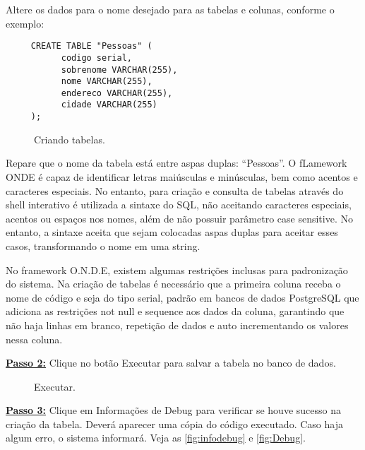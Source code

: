 \documentclass[9pt]{report}
\begin{document}
{   Altere os dados para o nome desejado para as tabelas e colunas,
   conforme o exemplo:
   
   \begin{lstlisting}
     CREATE TABLE "Pessoas" (
           codigo serial,
           sobrenome VARCHAR(255),
           nome VARCHAR(255),
           endereco VARCHAR(255),
           cidade VARCHAR(255) 
     );
   \end{lstlisting}


   \begin{figure}[H]
     \caption{Criando tabelas.}
     \label{fig:criandoTabelas}
   \end{figure}

    Repare que o nome da tabela está entre aspas duplas: “Pessoas”.
    O fLamework ONDE é capaz de identificar letras maiúsculas
    e minúsculas, bem como acentos e caracteres especiais. No
    entanto,
    para criação e consulta de tabelas através do shell interativo é
    utilizada a sintaxe do SQL, não aceitando caracteres especiais,
    acentos ou espaços nos nomes, além de não possuir parâmetro case
    sensitive. No entanto, a sintaxe aceita que sejam colocadas aspas
    duplas para aceitar esses casos, transformando o nome em uma
    string.

    No framework O.N.D.E, existem algumas restrições inclusas para
    padronização do sistema. Na criação de tabelas é necessário que
    a primeira coluna receba o nome de código e seja do tipo serial,
    padrão em bancos de dados PostgreSQL que adiciona as restrições
    not null e sequence aos dados da coluna, garantindo que não haja
    linhas em branco, repetição de dados e auto incrementando os
    valores nessa coluna.

    \underline{\textbf{Passo 2:}}  Clique no botão Executar para
    salvar a tabela no banco de dados.
   
   \begin{figure}[H]
     \caption{ Executar.}
     \label{fig:executandoConsulta}
   \end{figure}
   
   \underline{\textbf{Passo 3:}}  Clique em Informações de Debug para
   verificar se houve sucesso na criação da tabela. Deverá aparecer
   uma cópia do código executado. Caso haja algum erro, o sistema
   informará.
   Veja as \figurename{ \ref{fig:infodebug}} e \figurename{ \ref{fig:Debug}}.

}
\end{document}
